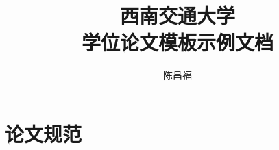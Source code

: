 \documentclass[doctor]{swjtuthesis}
\title{西南交通大学\\学位论文模板示例文档}
\author{陈昌福}
\begin{document}
\maketitle

%

\frontmatter

\tableofcontents
% 

\mainmatter






\appendix
\chapter{论文规范}

\backmatter


\end{document}

